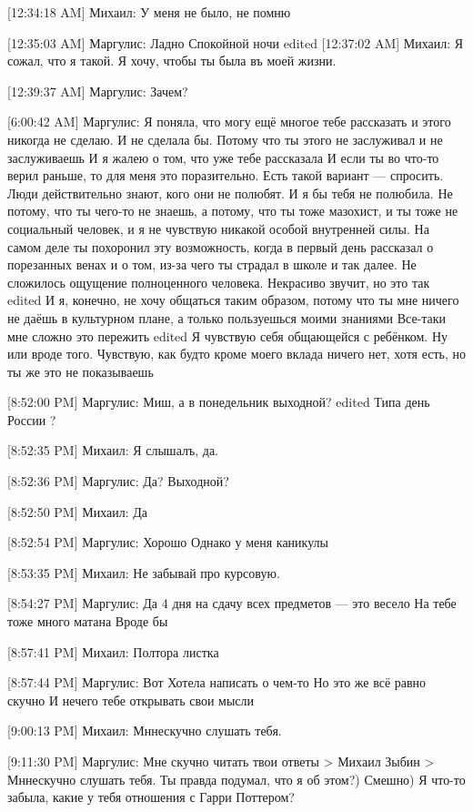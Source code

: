 \documentclass{article}
\newcommand{\yat}{{\fontencoding{X2}\selectfont\cyryat}} %
\begin{document}
[12:34:18 AM] Михаил:
У меня не было, не помню

[12:35:03 AM] Маргулис:
Ладно
 Спокойной ночи
edited 
[12:37:02 AM] Михаил:
Я сожал, что я такой. 
Я хочу, чтобы ты была въ моей жизни.

[12:39:37 AM] Маргулис:
Зачем?

[6:00:42 AM] Маргулис:
Я поняла, что могу ещё многое тебе рассказать и этого никогда не сделаю.
 И не сделала бы.
 Потому что ты этого не заслуживал и не заслуживаешь
 И я жалею о том, что уже тебе рассказала
 И если ты во что-то верил раньше, то для меня это поразительно. Есть такой вариант — спросить. Люди действительно знают, кого они не полюбят. И я бы тебя не полюбила. Не потому, что ты чего-то не знаешь, а потому, что ты тоже мазохист, и ты тоже не социальный человек, и я не чувствую никакой особой внутренней силы. На самом деле ты похоронил эту возможность, когда в первый день рассказал о порезанных венах и о том, из-за чего ты страдал в школе и так далее. Не сложилось ощущение полноценного человека. Некрасиво звучит, но это так
edited 
И я, конечно, не хочу общаться таким образом, потому что ты мне ничего не даёшь в культурном плане, а только пользуешься моими знаниями
 Все-таки мне сложно это пережить
edited 
Я чувствую себя общающейся с ребёнком. Ну или вроде того. Чувствую, как будто кроме моего вклада ничего нет, хотя есть, но ты же это не показываешь

[8:52:00 PM] Маргулис:
Миш, а в понедельник выходной?
edited 
Типа день России
 ?

[8:52:35 PM] Михаил:
Я слышалъ, да.

[8:52:36 PM] Маргулис:
Да?
 Выходной?

[8:52:50 PM] Михаил:
Да

[8:52:54 PM] Маргулис:
Хорошо
 Однако у меня каникулы

[8:53:35 PM] Михаил:
Не забывай про курсовую.

[8:54:27 PM] Маргулис:
Да
 4 дня на сдачу всех предметов — это весело
 На тебе тоже много матана
 Вроде бы

[8:57:41 PM] Михаил:
Полтора листка

[8:57:44 PM] Маргулис:
Вот
 Хотела написать о чем-то
 Но это же всё равно скучно
 И нечего тебе открывать свои мысли

[9:00:13 PM] Михаил:
Мн\yat нескучно слушать тебя.

[9:11:30 PM] Маргулис:
Мне скучно читать твои ответы
> Михаил Зыбин
> Мн\yat нескучно слушать тебя.
Ты правда подумал, что я об этом?)
 Смешно)
 Я что-то забыла, какие у тебя отношения с Гарри Поттером?
\end{document}
